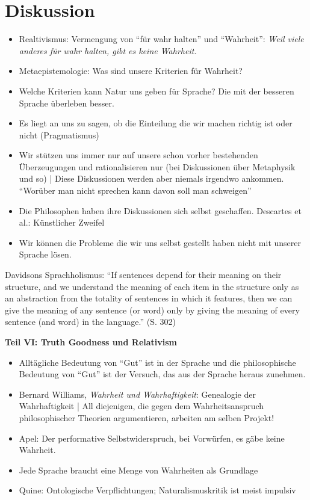 \documentclass[a4paper, emulatestandardclasses]{scrartcl}
\begin{document}
\section*{Diskussion}


\begin{itemize}
  \item Realtivismus: Vermengung von "`für wahr halten"' und "`Wahrheit"': \emph{Weil viele anderes für wahr halten, gibt es keine Wahrheit.}

  \item Metaepistemologie: Was sind unsere Kriterien für Wahrheit? 

  \item Welche Kriterien kann Natur uns geben für Sprache? Die mit der besseren Sprache überleben besser. 

  \item Es liegt an uns zu sagen, ob die Einteilung die wir machen richtig ist oder nicht (Pragmatismus)

  \item Wir stützen uns immer nur auf unsere schon vorher bestehenden Überzeugungen und rationalisieren nur (bei Diskussionen über Metaphysik und so) |  Diese Diskussionen werden aber niemals irgendwo ankommen. "`Worüber man nicht sprechen kann davon soll man schweigen"'

  \item Die Philosophen haben ihre Diskussionen sich selbst geschaffen. Descartes et al.: Künstlicher Zweifel

  \item Wir können die Probleme die wir uns selbst gestellt haben nicht mit unserer Sprache lösen.
\end{itemize}

Davidsons Sprachholismus: "`If sentences depend for their meaning on their structure, and we understand the meaning of each item in the structure only as an abstraction from the totality of sentences in which it features, then we can give the meaning of any sentence (or word) only by giving the meaning of every sentence (and word) in the language."' (S. 302)\newline


\noindent\textbf{Teil VI: Truth Goodness und Relativism}

\begin{itemize}
  \item Alltägliche Bedeutung von "`Gut"' ist in der Sprache und die philosophische Bedeutung von "`Gut"' ist der Versuch, das aus der Sprache heraus zunehmen. 
  \item Bernard Williams, \emph{Wahrheit und Wahrhaftigkeit}: Genealogie der Wahrhaftigkeit | All diejenigen, die gegen dem Wahrheitsanspruch philosophischer Theorien argumentieren, arbeiten am selben Projekt!
  \item Apel: Der performative Selbstwiderspruch, bei Vorwürfen, es gäbe keine Wahrheit.
  \item Jede Sprache braucht eine Menge von Wahrheiten als Grundlage
  \item Quine: Ontologische Verpflichtungen; Naturalismuskritik ist meist impulsiv
\end{itemize}
\end{document}
